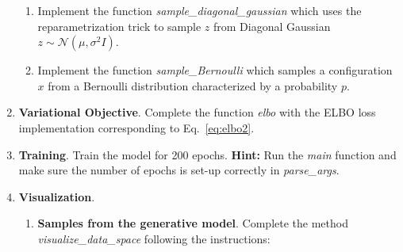 \begin{Q}
\begin{enumerate}
\begin{enumerate}
			\item  Implement the function \textit{sample\_diagonal\_gaussian} which uses the reparametrization trick to sample $z$ from Diagonal Gaussian $z \sim \mathcal{N}(\mu,\sigma^2 I)$.
			\item  Implement the function \textit{sample\_Bernoulli} which samples a configuration $x$ from a Bernoulli distribution characterized by a probability $p$.
		\end{enumerate}
		
		\item  \textbf{Variational Objective}. Complete the function \textit{elbo} with the ELBO loss implementation corresponding to Eq.~\ref{eq:elbo2}. 
		
		
		\item  \textbf{Training}. Train the model for 200 epochs. \textbf{Hint: } Run the \textit{main} function and make sure the number of epochs is set-up correctly in \textit{parse\_args}.
		
		\item \textbf{Visualization}.  
		\begin{enumerate}
			\item \textbf{Samples from the generative model}. Complete the method \textit{visualize\_data\_space} following the instructions:
			

\end{enumerate}
\end{enumerate}
\end{Q}
